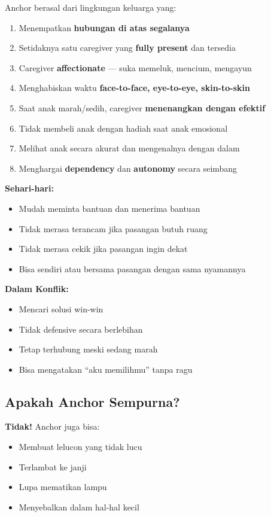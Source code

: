 Anchor berasal dari lingkungan keluarga yang:
\begin{enumerate}
    \item Menempatkan \textbf{hubungan di atas segalanya}
    \item Setidaknya satu caregiver yang \textbf{fully present} dan tersedia
    \item Caregiver \textbf{affectionate} --- suka memeluk, mencium, mengayun
    \item Menghabiskan waktu \textbf{face-to-face, eye-to-eye, skin-to-skin}
    \item Saat anak marah/sedih, caregiver \textbf{menenangkan dengan efektif}
    \item Tidak membeli anak dengan hadiah saat anak emosional
    \item Melihat anak secara akurat dan mengenalnya dengan dalam
    \item Menghargai \textbf{dependency} dan \textbf{autonomy} secara seimbang
\end{enumerate}

\begin{tipbox}
\textbf{Sehari-hari:}
\begin{itemize}
    \item Mudah meminta bantuan dan menerima bantuan
    \item Tidak merasa terancam jika pasangan butuh ruang
    \item Tidak merasa cekik jika pasangan ingin dekat
    \item Bisa sendiri atau bersama pasangan dengan sama nyamannya
\end{itemize}

\textbf{Dalam Konflik:}
\begin{itemize}
    \item Mencari solusi win-win
    \item Tidak defensive secara berlebihan
    \item Tetap terhubung meski sedang marah
    \item Bisa mengatakan ``aku memilihmu'' tanpa ragu
\end{itemize}
\end{tipbox}

\subsection{Apakah Anchor Sempurna?}

\textbf{Tidak!} Anchor juga bisa:
\begin{itemize}
    \item Membuat lelucon yang tidak lucu
    \item Terlambat ke janji
    \item Lupa mematikan lampu
    \item Menyebalkan dalam hal-hal kecil
\end{itemize}

